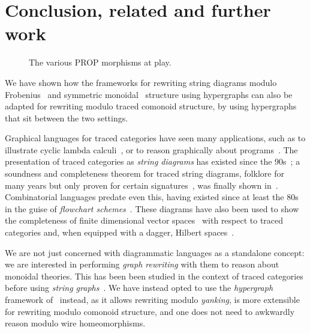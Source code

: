 \section{Conclusion, related and further work}

\begin{figure}
    \centering
    
    \caption{The various PROP morphisms at play.}
    \label{fig:roadmap}
\end{figure}

We have shown how the frameworks for rewriting string diagrams modulo
Frobenius~\cite{bonchi2022string} and symmetric
monoidal~\cite{bonchi2022stringa} structure using hypergraphs can also be
adapted for rewriting modulo traced comonoid structure, by using
hypergraphs that sit between the two settings.

Graphical languages for traced categories have seen many applications, such as
to illustrate cyclic lambda calculi~\cite{hasegawa1997recursion}, or to reason
graphically about programs~\cite{schweimeier1999categorical}.
The presentation of traced categories as \emph{string diagrams} has existed
since the 90s~\cite{joyal1991geometry,joyal1996traced}; a soundness and
completeness theorem for traced string diagrams, folklore for many years
but only proven for certain signatures~\cite{selinger2011survey}, was finally
shown in~\cite{kissinger2014abstract}.
Combinatorial languages predate even this, having existed since at least the 80s
in the guise of
\emph{flowchart schemes}~\cite{stefanescu1990feedback,cazanescu1990new,cazanescu1994feedback}.
These diagrams have also been used to show the completeness of finite dimensional
vector spaces~\cite{hasegawa2008finite} with respect to traced categories and,
when equipped with a dagger, Hilbert spaces~\cite{selinger2012finite}.

We are not just concerned with diagrammatic languages as a standalone concept:
we are interested in performing \emph{graph rewriting} with them to reason about
monoidal theories.
This has been been studied in the context of traced categories before using
\emph{string graphs}~\cite{kissinger2012pictures,dixon2013opengraphs}.
We have instead opted to use the \emph{hypergraph} framework
of~\cite{bonchi2022string,bonchi2022stringa,bonchi2022stringb} instead, as it
allows rewriting modulo \emph{yanking}, is more extensible for rewriting modulo
comonoid structure, and one does not need to awkwardly reason modulo wire
homeomorphisms.

